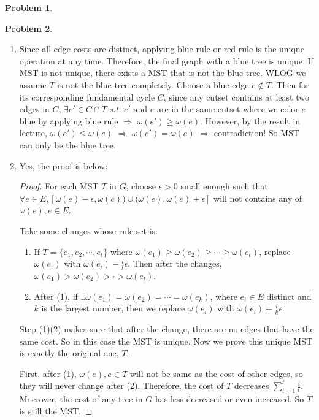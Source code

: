 \documentclass[a4paper]{article}
\theoremstyle{definition}
\newtheorem{problem}{Problem}
\theoremstyle{plain}
\newcommand{\dps}{\displaystyle}
\numberwithin{equation}{problem}
\newcommand{\st}{ \textit{ s.t. }}
\begin{document}
\begin{problem}
  
\end{problem}
\begin{problem}
  \begin{enumerate}[label=(\alph*)]
    \item Since all edge costs are distinct, applying blue rule or red rule is the unique operation at any time. Therefore, the final graph with a blue tree is unique. If MST is not unique, there exists a MST that is not the blue tree. WLOG we assume  $ T $ is not the blue tree completely. Choose a blue edge  $ e\not\in T $. Then for  its corresponding fundamental cycle   $ C $, since any cutset contains at least two edges in  $ C $,  $ \exists e'\in C\cap T $ \st  $ e' $ and  $ e $ are in the same cutset where  we color  $ e $ blue by applying blue rule $ \Rightarrow $      $ \omega(e') \geq \omega(e) $. However, by the result in lecture,  $ \omega(e') \leq \omega(e) $ $ \Rightarrow  $  $ \omega(e')=\omega(e) $ $ \Rightarrow  $ contradiction!      So  MST can only be the blue tree.
    \item Yes, the proof is below:
    \begin{proof}
      For each MST  $ T $ in  $ G $, choose  $ \epsilon>0 $ small enough such that  $\forall e\in E, [\omega(e)-\epsilon,\omega(e))\cup(\omega(e),\omega(e)+\epsilon] $ will not contains any of  $ \omega(e),e\in E $.
      
      Take some changes whose rule set is:
      \begin{enumerate}[label=(\arabic*)]
        \item If  $ T=\{e_1,e_2,\cdots,e_t\} $ where  $ \omega(e_1)  \geq  \omega(e_2)  \geq  \cdots  \geq  \omega(e_t) $, replace  $ \omega(e_i) $ with  $ \omega(e_i)-\frac{i}{t}\epsilon $. Then after the changes,  $ \omega(e_1)>\omega(e_2)>\cdot>\omega(e_t) $.  
        \item   After (1), if  $ \exists \omega(e_1)=\omega(e_2)=\cdots=\omega(e_k) $, where  $ e_i\in E $ distinct and  $ k $ is the largest number, then we replace  $ \omega(e_i) $ with  $ \omega(e_i)+\frac{i}{k}\epsilon $.     
      \end{enumerate}
      Step (1)(2) makes sure that after the change, there are no edges that have the same cost. So in this case the MST is unique. Now we prove this unique MST is exactly the original one,  $ T $.
      
      First, after (1),  $ \omega(e),e\in T $ will not be same as the cost of other edges, so they will never change after (2). Therefore, the cost of  $ T $  decreases  $ \dps\sum_{i=1}^t\frac{i}{t}$. Moerover, the cost of  any tree in  $ G $ has less decreased or even increased. So  $ T $ is still the MST.    


\end{proof}
\end{enumerate}
\end{problem}
\end{document}
